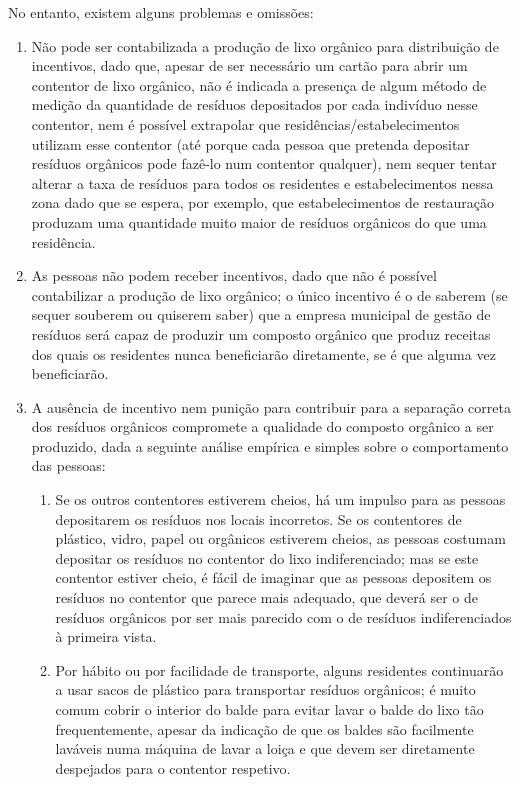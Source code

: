 \documentclass[11pt, a4paper, oneside]{book}
\begin{document}
No entanto, existem alguns problemas e omissões:

\begin{enumerate}
    
    \item Não pode ser contabilizada a produção de lixo orgânico para distribuição de incentivos, dado que, apesar de ser necessário um cartão para abrir um contentor de lixo orgânico, não é indicada a presença de algum método de medição da quantidade de resíduos depositados por cada indivíduo nesse contentor, nem é possível extrapolar que residências/estabelecimentos utilizam esse contentor (até porque cada pessoa que pretenda depositar resíduos orgânicos pode fazê-lo num contentor qualquer), nem sequer tentar alterar a taxa de resíduos para todos os residentes e estabelecimentos nessa zona dado que se espera, por exemplo, que estabelecimentos de restauração produzam uma quantidade muito maior de resíduos orgânicos do que uma residência.

    \item As pessoas não podem receber incentivos, dado que não é possível contabilizar a produção de lixo orgânico; o único incentivo é o de saberem (se sequer souberem ou quiserem saber) que a empresa municipal de gestão de resíduos será capaz de produzir um composto orgânico que produz receitas dos quais os residentes nunca beneficiarão diretamente, se é que alguma vez beneficiarão.
    
    \item A ausência de incentivo nem punição para contribuir para a separação correta dos resíduos orgânicos compromete a qualidade do composto orgânico a ser produzido, dada a seguinte análise empírica e simples sobre o comportamento das pessoas:
    \begin{enumerate}
        \item Se os outros contentores estiverem cheios, há um impulso para as pessoas depositarem os resíduos nos locais incorretos. Se os contentores de plástico, vidro, papel ou orgânicos estiverem cheios, as pessoas costumam depositar os resíduos no contentor do lixo indiferenciado; mas se este contentor estiver cheio, é fácil de imaginar que as pessoas depositem os resíduos no contentor que parece mais adequado, que deverá ser o de resíduos orgânicos por ser mais parecido com o de resíduos indiferenciados à primeira vista.
        \item Por hábito ou por facilidade de transporte, alguns residentes continuarão a usar sacos de plástico para transportar resíduos orgânicos; é muito comum cobrir o interior do balde para evitar lavar o balde do lixo tão frequentemente, apesar da indicação de que os baldes são facilmente laváveis numa máquina de lavar a loiça e que devem ser diretamente despejados para o contentor respetivo.
    \end{enumerate}
\end{enumerate}
\end{document}
